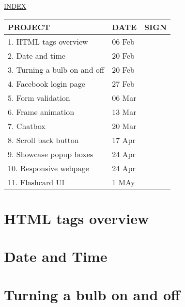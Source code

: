 \documentclass[12pt]{article}
\begin{document}

\Huge
{}
\centering \underline{INDEX} \\
\vspace*{3\baselineskip}
\setlength{\arrayrulewidth}{0.4mm}
\renewcommand{\arraystretch}{1.8}
\setlength{\tabcolsep}{10pt}

\LARGE
\begin{tabular}{|m{8.5cm}|m{2.2cm}|m{3cm}|}
  \hline
  PROJECT & DATE & SIGN \\
  \hline
  \hline
  1. HTML tags overview & 06 Feb & \\
  2. Date and time & 20 Feb & \\
  3. Turning a bulb on and off & 20 Feb & \\
  4. Facebook login page & 27 Feb & \\
  5. Form validation & 06 Mar & \\
  6. Frame animation & 13 Mar & \\
  7. Chatbox & 20 Mar & \\
  8. Scroll back button & 17 Apr & \\
  9. Showcase popup boxes & 24 Apr & \\
  10. Responsive webpage & 24 Apr & \\
  11. Flashcard UI & 1 MAy & \\
  \hline
\end{tabular}
\newpage
\restoregeometry
\normalsize

\section{HTML tags overview}
\newpage

\section{Date and Time}

\section{Turning a bulb on and off}
\newpage
\end{document}
